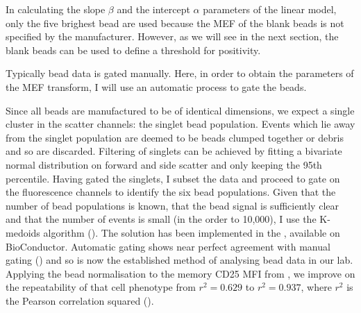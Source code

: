 In calculating the slope $\beta$ and the intercept $\alpha$ parameters of the linear model,
only the five brighest bead are used because the MEF of the blank beads is not specified by the manufacturer.
However, as we will see in the next section, the blank beads can be used to define a threshold for positivity.

Typically bead data is gated manually.
Here, in order to obtain the parameters of the MEF transform, I will use an automatic process to gate the beads.

Since all beads are manufactured to be of identical dimensions, we expect a single cluster in the scatter channels: the singlet bead population.
Events which lie away from the singlet population are deemed to be beads clumped together or debris and so are discarded.
Filtering of singlets can be achieved by fitting a bivariate normal distribution on forward and side scatter and only keeping the 95th percentile.
Having gated the singlets, I subset the data and proceed to gate on the fluorescence channels to identify the six bead populations.
Given that the number of bead populations is known, that the bead signal is sufficiently clear and that the number of events is small (in the order to 10,000),
I use the K-medoids algorithm ().
The solution has been implemented in the , available on BioConductor.
Automatic gating shows near perfect agreement with manual gating () and so is now the established method of analysing
bead data in our lab.
Applying the bead normalisation to the memory CD25 MFI from , we improve on the repeatability of that 
cell phenotype from $r^2=0.629$ to $r^2=0.937$, where $r^2$ is the Pearson correlation squared ().

